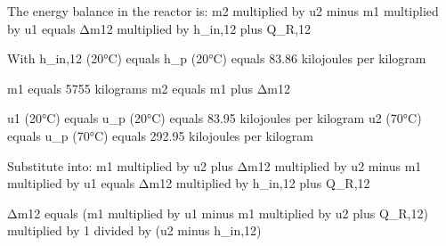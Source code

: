 The energy balance in the reactor is:  
m2 multiplied by u2 minus m1 multiplied by u1 equals Δm12 multiplied by h_in,12 plus Q_R,12  

With h_in,12 (20°C) equals h_p (20°C) equals 83.86 kilojoules per kilogram  

m1 equals 5755 kilograms  
m2 equals m1 plus Δm12  

u1 (20°C) equals u_p (20°C) equals 83.95 kilojoules per kilogram  
u2 (70°C) equals u_p (70°C) equals 292.95 kilojoules per kilogram  

Substitute into:  
m1 multiplied by u2 plus Δm12 multiplied by u2 minus m1 multiplied by u1 equals Δm12 multiplied by h_in,12 plus Q_R,12  

Δm12 equals (m1 multiplied by u1 minus m1 multiplied by u2 plus Q_R,12) multiplied by 1 divided by (u2 minus h_in,12)